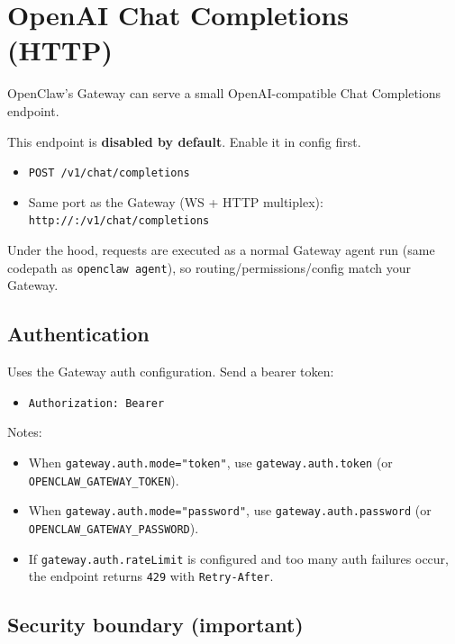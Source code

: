 \clearpage

\section{OpenAI Chat Completions (HTTP)}


OpenClaw’s Gateway can serve a small OpenAI-compatible Chat Completions endpoint.

This endpoint is \textbf{disabled by default}. Enable it in config first.

\begin{itemize}
  \item \texttt{POST /v1/chat/completions}
  \item Same port as the Gateway (WS + HTTP multiplex): \texttt{http://:/v1/chat/completions}
\end{itemize}


Under the hood, requests are executed as a normal Gateway agent run (same codepath as \texttt{openclaw agent}), so routing/permissions/config match your Gateway.

\subsection{Authentication}


Uses the Gateway auth configuration. Send a bearer token:

\begin{itemize}
  \item \texttt{Authorization: Bearer }
\end{itemize}


Notes:

\begin{itemize}
  \item When \texttt{gateway.auth.mode="token"}, use \texttt{gateway.auth.token} (or \texttt{OPENCLAW\_GATEWAY\_TOKEN}).
  \item When \texttt{gateway.auth.mode="password"}, use \texttt{gateway.auth.password} (or \texttt{OPENCLAW\_GATEWAY\_PASSWORD}).
  \item If \texttt{gateway.auth.rateLimit} is configured and too many auth failures occur, the endpoint returns \texttt{429} with \texttt{Retry-After}.
\end{itemize}


\subsection{Security boundary (important)}


